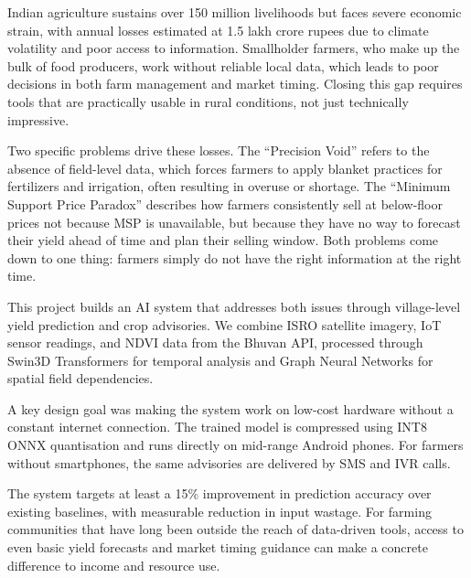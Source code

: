 Indian agriculture sustains over 150 million livelihoods but faces severe economic strain, with annual losses estimated at 1.5 lakh crore rupees due to climate volatility and poor access to information. Smallholder farmers, who make up the bulk of food producers, work without reliable local data, which leads to poor decisions in both farm management and market timing. Closing this gap requires tools that are practically usable in rural conditions, not just technically impressive.

Two specific problems drive these losses. The ``Precision Void'' refers to the absence of field-level data, which forces farmers to apply blanket practices for fertilizers and irrigation, often resulting in overuse or shortage. The ``Minimum Support Price Paradox'' describes how farmers consistently sell at below-floor prices not because MSP is unavailable, but because they have no way to forecast their yield ahead of time and plan their selling window. Both problems come down to one thing: farmers simply do not have the right information at the right time.

This project builds an AI system that addresses both issues through village-level yield prediction and crop advisories. We combine ISRO satellite imagery, IoT sensor readings, and NDVI data from the Bhuvan API, processed through Swin3D Transformers for temporal analysis and Graph Neural Networks for spatial field dependencies.

A key design goal was making the system work on low-cost hardware without a constant internet connection. The trained model is compressed using INT8 ONNX quantisation and runs directly on mid-range Android phones. For farmers without smartphones, the same advisories are delivered by SMS and IVR calls.

The system targets at least a 15\% improvement in prediction accuracy over existing baselines, with measurable reduction in input wastage. For farming communities that have long been outside the reach of data-driven tools, access to even basic yield forecasts and market timing guidance can make a concrete difference to income and resource use.


